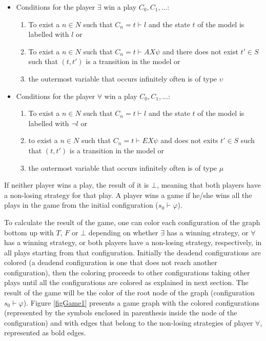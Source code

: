 \documentclass{llncs}
\begin{document}
\begin{itemize}
\item[] Conditions for the player $\exists$ win a play $C_{0}, C_{1}, ...$:
\begin{enumerate}
\item To exist a $n \in N$ such that $C_{n} = t \vdash l$ and the state $t$ of the model is labelled with $l$ or
\item To exist a $n \in N$ such that $C_{n} = t \vdash AX \psi$ and there does not exist $t' \in S$ such that $(t,t')$ is a transition in the model or
\item the outermost variable that occurs infinitely often is of type $\upsilon$
\end{enumerate}
\end{itemize}

\begin{itemize}
\item[] Conditions for the player $\forall$ win a play $C_{0}, C_{1}, ...$:
\begin{enumerate}
\item To exist a $n \in N$ such that $C_{n} = t \vdash l$ and the state $t$ of the model is labelled with $\neg l$ or
\item to exist a $n \in N$ such that $C_{n} = t \vdash EX \psi$ and does not exits $t' \in S$ such that $(t,t')$ is a transition in the model or
\item the outermost variable that occurs infinitely often is of type $\mu$
\end{enumerate}
\end{itemize}

If neither player wins a play, the result of it is $\bot$, meaning that both players have a non-losing strategy for that play. A player wins a game if he/she wins all the plays in the game from the initial configuration ($s_{0} \vdash \varphi$).

To calculate the result of the game, one can color each configuration of the graph bottom up with $T$, $F$ or $\bot$ depending on whether $\exists$ has a winning strategy, or $\forall$ has a winning strategy, or both players have a non-losing strategy, respectively, in all plays starting from that configuration. Initially the deadend configurations are colored (a deadend configuration is one that does not reach another configuration), then the coloring proceeds to other configurations taking other plays until all the configurations are colored as explained in next section. The result of the game will be the color of the root node of the graph (configuration $s_{0} \vdash \varphi$). Figure \ref{figGame1} presents a game graph with the colored configurations (represented by the symbols enclosed in parenthesis inside the node of the configuration) and with edges that belong to the non-losing strategies of player $\forall$, represented as bold edges.  
\end{document}
